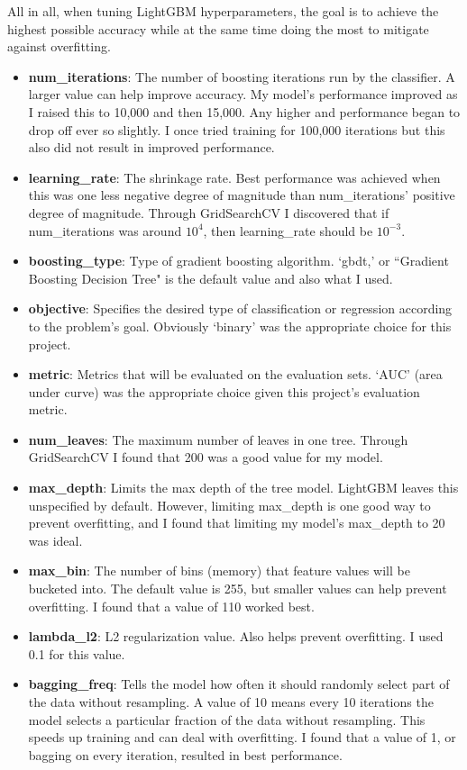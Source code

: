 \documentclass[12pt, letterpaper]{article}
\begin{document}
All in all, when tuning LightGBM hyperparameters, the goal is to achieve the highest possible accuracy while at the same time doing the most to mitigate against overfitting. \cite{lightgbmparams} \cite{lightgbmparamtuning}

\begin{itemize}
  \item \textbf{num_iterations}: The number of boosting iterations run by the classifier. A larger value can help improve accuracy. My model's performance improved as I raised this to 10,000 and then 15,000. Any higher and performance began to drop off ever so slightly. I once tried training for 100,000 iterations but this also did not result in improved performance.
  \item \textbf{learning_rate}: The shrinkage rate. Best performance was achieved when this was one less negative degree of magnitude than num_iterations' positive degree of magnitude. Through GridSearchCV I discovered that if num_iterations was around $10^{4}$, then learning_rate should be $10^{-3}$.
  \item \textbf{boosting_type}: Type of gradient boosting algorithm. `gbdt,' or ``Gradient Boosting Decision Tree" is the default value and also what I used.
  \item \textbf{objective}: Specifies the desired type of classification or regression according to the problem's goal. Obviously `binary' was the appropriate choice for this project.
  \item \textbf{metric}: Metrics that will be evaluated on the evaluation sets. `AUC' (area under curve) was the appropriate choice given this project's evaluation metric.
  \item \textbf{num_leaves}: The maximum number of leaves in one tree. Through GridSearchCV I found that 200 was a good value for my model.
  \item \textbf{max_depth}: Limits the max depth of the tree model. LightGBM leaves this unspecified by default. However, limiting max_depth is one good way to prevent overfitting, and I found that limiting my model's max_depth to 20 was ideal.
  \item \textbf{max_bin}: The number of bins (memory) that feature values will be bucketed into. The default value is 255, but smaller values can help prevent overfitting. I found that a value of 110 worked best.
  \item \textbf{lambda_l2}: L2 regularization value. Also helps prevent overfitting. I used 0.1 for this value.
  \item \textbf{bagging_freq}: Tells the model how often it should randomly select part of the data without resampling. A value of 10 means every 10 iterations the model selects a particular fraction of the data without resampling. This speeds up training and can deal with overfitting. I found that a value of 1, or bagging on every iteration, resulted in best performance.

\end{itemize}
\end{document}
